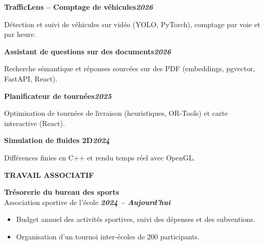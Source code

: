 \documentclass[10pt,a4paper]{article}
\newcommand{\rubrique}[2][12pt plus 2fil]{%
  \par\vspace{#1}%
  {\fontsize{13}{15.5}\selectfont \textbf{\color{cvprimary}#2}\par}%
  \vspace{2pt}{\color{cvprimary}\hrule height 0.4pt}\vspace{7pt}}
\newcommand{\entre}{\par\vspace{7pt plus 1fil}}
\newlength{\hauteurcol}
\begin{document}
\begin{minipage}[t][\hauteurcol][s]{0.55\textwidth}
\par\textbf{TrafficLens – Comptage de véhicules}\hfill\textbf{\textit{2026}}\par
Détection et suivi de véhicules sur vidéo (YOLO, PyTorch), comptage par voie et par heure.
\entre
\par\textbf{Assistant de questions sur des documents}\hfill\textbf{\textit{2026}}\par
Recherche sémantique et réponses sourcées sur des PDF (embeddings, pgvector, FastAPI, React).
\entre
\par\textbf{Planificateur de tournées}\hfill\textbf{\textit{2025}}\par
Optimisation de tournées de livraison (heuristiques, OR-Tools) et carte interactive (React).
\entre
\par\textbf{Simulation de fluides 2D}\hfill\textbf{\textit{2024}}\par
Différences finies en C++ et rendu temps réel avec OpenGL.


\rubrique{TRAVAIL ASSOCIATIF}

\textbf{Trésorerie du bureau des sports}\\
Association sportive de l'école \hfill \textbf{\textit{2024 – Aujourd'hui}}\par\vspace{3pt}
\begin{itemize}
    \item Budget annuel des activités sportives, suivi des dépenses et des subventions.
    \item Organisation d'un tournoi inter-écoles de 200 participants.
\end{itemize}


\end{minipage}
\end{document}

